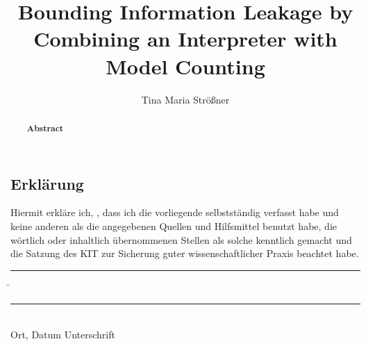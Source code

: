 \documentclass[parskip=no,12pt,a4paper,twoside,headings=openright]{scrreprt}
\title{Bounding Information Leakage by Combining an Interpreter with Model Counting}
\author{Tina Maria Strößner}
\begin{document}
\begin{otherlanguage}{ngerman} %
\mytitlepage
\end{otherlanguage}

\begin{abstract}
\begin{center}\Huge\textbf{\textsf{Abstract}}
\end{center}
\vfill
\end{abstract}

\tableofcontents













\begin{otherlanguage}{ngerman}
\chapter*{Erklärung}
\pagestyle{empty}

  \vspace{20mm}
  Hiermit erkläre ich, \theauthor, dass ich die vorliegende \thethesistype{} selbst\-ständig
verfasst habe und keine anderen als die angegebenen Quellen und Hilfsmittel
benutzt habe, die wörtlich oder inhaltlich übernommenen Stellen als solche kenntlich gemacht und
die Satzung des KIT zur Sicherung guter wissenschaftlicher Praxis beachtet habe.
  \vspace{20mm}
  \begin{tabbing}
  \rule{4cm}{.4pt}\hspace{1cm} \= \rule{7cm}{.4pt} \\
 Ort, Datum \> Unterschrift
  \end{tabbing}
\end{otherlanguage}

\pagestyle{fancy}
\appendix




\end{document}
